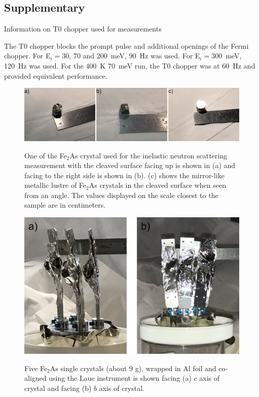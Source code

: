 \documentclass[10pt,doublespacing,edeposit]{uiucthesis2020}
\begin{document}
\begin{mainmatter}
\section{Supplementary}

Information on T0 chopper used for measurements

The T0 chopper blocks the prompt pulse and additional openings of the Fermi chopper.  For E$_i = 30$, 70 and 200~meV, 90~Hz was used. For E$_i = 300$~meV, 120~Hz was used.
For the 400~K 70~meV run, the T0 chopper was at 60~Hz and provided equivalent performance.

\vspace{2em}

\begin{figure}[h]
\centering\includegraphics[width=\columnwidth]{figures/ch8/crystal.png} \\
\caption{\label{fig:crystal_array}
One of the Fe$_2$As crystal used for the inelastic neutron scattering measurement with the cleaved surface facing up is shown in (a) and facing to the right side is shown in (b). (c) shows the mirror-like metallic lustre of Fe$_2$As crystals in the cleaved surface when seen from an angle. The values displayed on the scale closest to the sample are in centimeters.
} 
\end{figure}

\begin{figure}[h]
\centering\includegraphics[width=0.5\columnwidth]{figures/ch8/crystal_array.png} \\
\caption{\label{fig:crystal_array}
Five Fe$_2$As single crystals (about 9 g), wrapped in Al foil and co-aligned using the Laue instrument is shown facing (a) $c$ axis of crystal and facing (b) $b$ axis of crystal.
} 
\end{figure}


\end{mainmatter}
\end{document}
